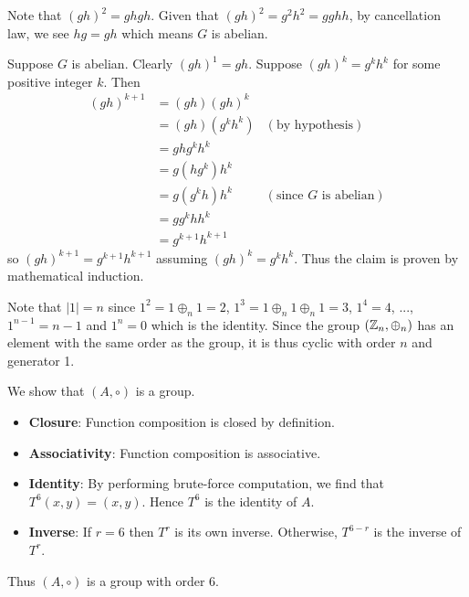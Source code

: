 \begin{questions}
    \item \begin{partquestions}{\alph*}
        \item Note that $(gh)^2 = ghgh$. Given that $(gh)^2 = g^2h^2 = gghh$, by cancellation law, we see $hg = gh$ which means $G$ is abelian.

        \item Suppose $G$ is abelian. Clearly $(gh)^1 = gh$. Suppose $(gh)^{k} = g^kh^k$ for some positive integer $k$. Then
        \begin{align*}
            (gh)^{k+1} &= (gh)(gh)^k\\
            &= (gh)(g^kh^k) & (\text{by hypothesis})\\
            &= ghg^kh^k\\
            &= g(hg^k)h^k\\
            &= g(g^kh)h^k & (\text{since } G \text{ is abelian})\\
            &= gg^khh^k\\
            &= g^{k+1}h^{k+1}
        \end{align*}
        so $(gh)^{k+1} = g^{k+1}h^{k+1}$ assuming $(gh)^k = g^kh^k$. Thus the claim is proven by mathematical induction.
    \end{partquestions}

    \item Note that $|1| = n$ since $1^2 = 1 \oplus_n 1 = 2$, $1^3 = 1 \oplus_n 1 \oplus_n 1 = 3$, $1^4 = 4$, ..., $1^{n-1} = n-1$ and $1^n = 0$ which is the identity. Since the group $(\mathbb{Z}_n, \oplus_n)$ has an element with the same order as the group, it is thus cyclic with order $n$ and generator 1.

    \item We show that $(A, \circ)$ is a group.
    \begin{itemize}
            \item \textbf{Closure}: Function composition is closed by definition.
            \item \textbf{Associativity}: Function composition is associative.
            \item \textbf{Identity}: By performing brute-force computation, we find that $T^6(x, y) = (x, y)$. Hence $T^6$ is the identity of $A$.
            \item \textbf{Inverse}: If $r = 6$ then $T^r$ is its own inverse. Otherwise, $T^{6-r}$ is the inverse of $T^r$.
    \end{itemize}
    Thus $(A, \circ)$ is a group with order 6.
\end{questions}
